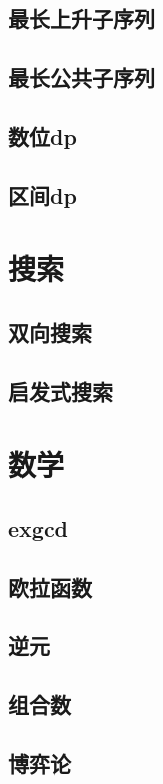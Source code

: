 \documentclass[twocolumn,a4]{article}
\newcommand{\addcpp}[1]{}
\begin{document}
	\subsection{最长上升子序列}
		\addcpp{dp/LIS.tex}
	\subsection{最长公共子序列}
		\addcpp{dp/LCS.tex}
	\subsection{数位dp}
		\addcpp{dp/numdp.tex}
	\subsection{区间dp}
		\addcpp{dp/rangedp.tex}		
		
\section{搜索}
	\subsection{双向搜索}
		\addcpp{search/double_search.tex}
	\subsection{启发式搜索}
		\addcpp{search/heuristic.tex}

\section{数学}
	\subsection{exgcd}
		\addcpp{math/exgcd.tex}
	\subsection{欧拉函数}
		\addcpp{math/eular.tex}
	\subsection{逆元}
		\addcpp{math/inv.tex}
	\subsection{组合数}
		\addcpp{math/comb.tex}
	\subsection{博弈论}
		\addcpp{math/game.tex}
\end{document}
